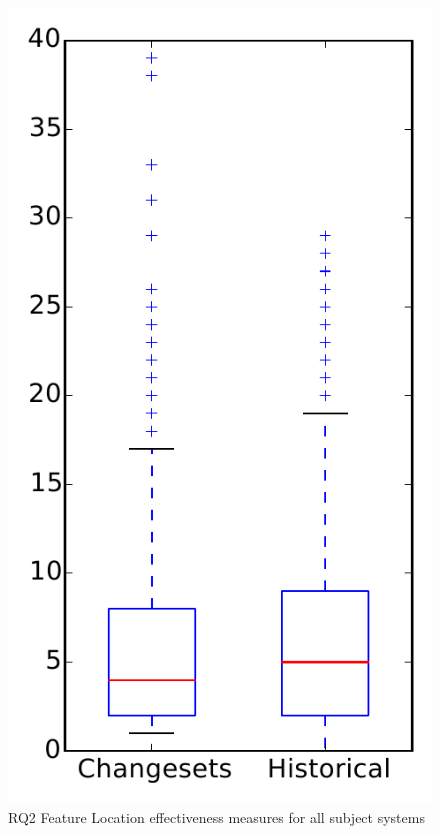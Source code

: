 
\begin{figure}
\centering
\includegraphics[height=0.4\textheight]{figures/flt/rq2_overview}
\caption{RQ2 Feature Location effectiveness measures for all subject systems}
\label{fig:flt:rq2:overview}
\end{figure}

